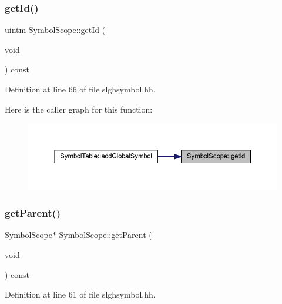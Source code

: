\subsubsection{\texorpdfstring{getId()}{getId()}}
{\footnotesize\ttfamily uintm Symbol\+Scope\+::get\+Id (\begin{DoxyParamCaption}\item[{void}]{ }\end{DoxyParamCaption}) const\hspace{0.3cm}{\ttfamily [inline]}}



Definition at line 66 of file slghsymbol.\+hh.

Here is the caller graph for this function\+:
\nopagebreak
\begin{figure}[H]
\begin{center}
\leavevmode
\includegraphics[width=350pt]{class_symbol_scope_ab78b27aa1cb0b43da992d9317db30b79_icgraph}
\end{center}
\end{figure}
\mbox{\label{class_symbol_scope_aedff22c75734b479c4ce48cb87a2be23}} 
\subsubsection{\texorpdfstring{getParent()}{getParent()}}
{\footnotesize\ttfamily \mbox{\hyperlink{class_symbol_scope}{Symbol\+Scope}}$\ast$ Symbol\+Scope\+::get\+Parent (\begin{DoxyParamCaption}\item[{void}]{ }\end{DoxyParamCaption}) const\hspace{0.3cm}{\ttfamily [inline]}}



Definition at line 61 of file slghsymbol.\+hh.

